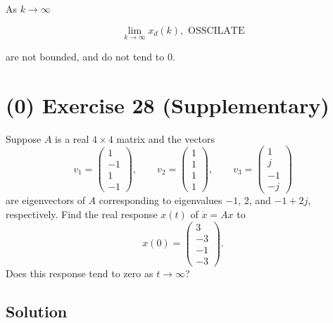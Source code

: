 \documentclass[12pt,a4paper]{article}
\begin{document}
As $k\to\infty$

\[
\lim_{k \to \infty} x_d(k) , \text{ OSSCILATE}
\]

are not bounded, and do not tend to $0$.



































\vspace{5cm}
\clearpage
\section*{(0) Exercise 28 \hfill {\normalsize (Supplementary)}}
Suppose $A$ is a real $4\times4$ matrix and the vectors
\[
v_1=\begin{pmatrix}1\\-1\\1\\-1\end{pmatrix},\qquad
v_2=\begin{pmatrix}1\\1\\1\\1\end{pmatrix},\qquad
v_3=\begin{pmatrix}1\\j\\-1\\-j\end{pmatrix}
\]
are eigenvectors of $A$ corresponding to eigenvalues $-1$, $2$, and
$-1+2j$, respectively. Find the real response $x(t)$ of $\dot x=Ax$ to
\[
x(0)=\begin{pmatrix}3\\-3\\-1\\-3\end{pmatrix}.
\]
Does this response tend to zero as $t\to\infty$?

\subsection*{Solution}
\end{document}

